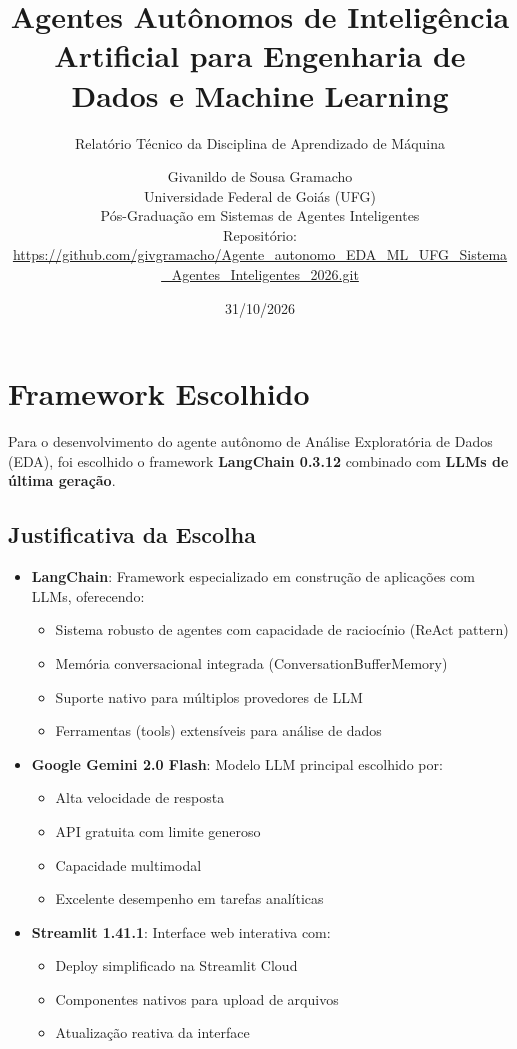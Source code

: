 \documentclass[12pt,a4paper]{article}
\title{\textbf{Agentes Autônomos de Inteligência Artificial para Engenharia de Dados e Machine Learning}}
\subtitle{Relatório Técnico da Disciplina de Aprendizado de Máquina}
\author{Givanildo de Sousa Gramacho \\ \small Universidade Federal de Goiás (UFG) \\ \small Pós-Graduação em Sistemas de Agentes Inteligentes \\ \small Repositório: \url{https://github.com/givgramacho/Agente_autonomo_EDA_ML_UFG_Sistema_Agentes_Inteligentes_2026.git}}
\date{31/10/2026}
\begin{document}
\maketitle
\newpage

\tableofcontents
\newpage

\section{Framework Escolhido}

Para o desenvolvimento do agente autônomo de Análise Exploratória de Dados (EDA), foi escolhido o framework \textbf{LangChain 0.3.12} combinado com \textbf{LLMs de última geração}.

\subsection{Justificativa da Escolha}

\begin{itemize}
    \item \textbf{LangChain}: Framework especializado em construção de aplicações com LLMs, oferecendo:
    \begin{itemize}
        \item Sistema robusto de agentes com capacidade de raciocínio (ReAct pattern)
        \item Memória conversacional integrada (ConversationBufferMemory)
        \item Suporte nativo para múltiplos provedores de LLM
        \item Ferramentas (tools) extensíveis para análise de dados
    \end{itemize}
    
    \item \textbf{Google Gemini 2.0 Flash}: Modelo LLM principal escolhido por:
    \begin{itemize}
        \item Alta velocidade de resposta
        \item API gratuita com limite generoso
        \item Capacidade multimodal
        \item Excelente desempenho em tarefas analíticas
    \end{itemize}
    
    \item \textbf{Streamlit 1.41.1}: Interface web interativa com:
    \begin{itemize}
        \item Deploy simplificado na Streamlit Cloud
        \item Componentes nativos para upload de arquivos
        \item Atualização reativa da interface
    \end{itemize}
\end{itemize}
\end{document}
